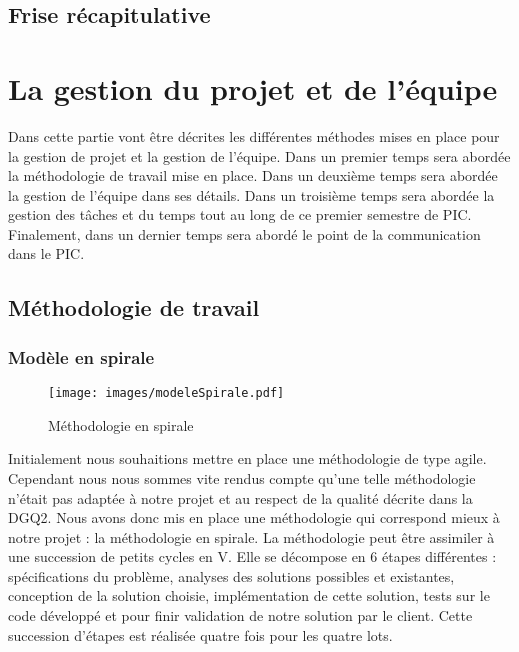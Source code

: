 \documentclass[asi]{picInsa}
\begin{document}
\section{Frise récapitulative}





\chapter{La gestion du projet et de l'équipe}
\label{gestion_equipe}
Dans cette partie vont être décrites les différentes méthodes mises en place pour la gestion de projet et la gestion de l'équipe. Dans un premier temps sera abordée la méthodologie de travail mise en place. Dans un deuxième temps sera abordée la gestion de l'équipe dans ses détails. Dans un troisième temps sera abordée la gestion des tâches et du temps tout au long de ce premier semestre de PIC. Finalement, dans un dernier temps sera abordé le point de la communication dans le PIC.

\section{Méthodologie de travail}
\subsection{Modèle en spirale}
\begin{figure}[!h]
	\begin{center}
	\texttt{[image: images/modeleSpirale.pdf]}
	\label{diagrammeSpirale}
	\caption{Méthodologie en spirale}
	\end{center}
\end{figure}

Initialement nous souhaitions mettre en place une méthodologie de type agile. Cependant nous nous sommes vite rendus compte qu'une telle méthodologie n'était pas adaptée à notre projet et au respect de la qualité décrite dans la DGQ2. Nous avons donc mis en place une méthodologie qui correspond mieux à notre projet : la méthodologie en spirale. La méthodologie peut être assimiler à une succession de petits cycles en V. Elle se décompose en 6 étapes différentes : spécifications du problème, analyses des solutions possibles et existantes, conception de la solution choisie, implémentation de cette solution, tests sur le code développé et pour finir validation de notre solution par le client. Cette succession d'étapes est réalisée quatre fois pour les quatre lots.
\end{document}
